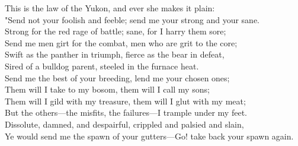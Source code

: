 
\begin{adjustwidth}{0em}{0em}
\begin{poemblock}
This is the law of the Yukon, and ever she makes it plain:\\
"Send not your foolish and feeble; send me your strong and your sane.\\
Strong for the red rage of battle; sane, for I harry them sore;\\
Send me men girt for the combat, men who are grit to the core;\\
Swift as the panther in triumph, fierce as the bear in defeat,\\
Sired of a bulldog parent, steeled in the furnace heat.\\
Send me the best of your breeding, lend me your chosen ones;\\
Them will I take to my bosom, them will I call my sons;\\
Them will I gild with my treasure, them will I glut with my meat;\\
But the others—the misfits, the failures—I trample under my feet.\\
Dissolute, damned, and despairful, crippled and palsied and slain,\\
Ye would send me the spawn of your gutters—Go! take back your spawn again.


\end{poemblock}
\end{adjustwidth}
